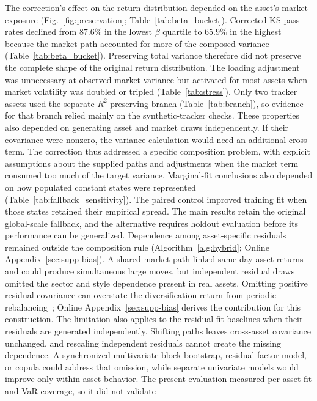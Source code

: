 The correction's effect on the return distribution depended on the
asset's market exposure (Fig.~\ref{fig:preservation};
Table~\ref{tab:beta_bucket}). Corrected KS pass rates declined from
$87.6\%$ in the lowest $\beta$ quartile to $65.9\%$ in the highest
because the market path accounted for more of the composed variance
(Table~\ref{tab:beta_bucket}). Preserving total variance therefore
did not preserve the complete shape of the original return
distribution. The loading adjustment was unnecessary at observed
market variance but activated for most assets when market volatility
was doubled or tripled (Table~\ref{tab:stress}). Only two tracker
assets used the separate $R^2$-preserving branch
(Table~\ref{tab:branch}), so evidence for that branch relied mainly
on the synthetic-tracker checks. These properties also depended on
generating asset and market draws independently. If their covariance
were nonzero, the variance calculation would need an additional
cross-term. The correction thus addressed a specific composition
problem, with explicit assumptions about the supplied paths and
adjustments when the market term consumed too much of the target
variance.
Marginal-fit conclusions also depended on how populated constant
states were represented (Table~\ref{tab:fallback_sensitivity}). The paired control improved training fit
when those states retained their empirical spread. The main results
retain the original global-scale fallback, and the alternative
requires holdout evaluation before its performance can be generalized.
Dependence among asset-specific residuals remained outside the
composition rule (Algorithm~\ref{alg:hybrid}; Online
Appendix~\ref{sec:supp-bias}). A shared market path linked same-day asset returns and
could produce simultaneous large moves, but independent residual
draws omitted the sector and style dependence present in real assets.
Omitting positive residual covariance can overstate the diversification
return from periodic rebalancing~\cite{boothFama1992,
boucheyNemtchinovWong2015, markowitz1976longRun}; Online
Appendix~\ref{sec:supp-bias} derives the contribution for this
construction. The limitation also applies to the residual-fit
baselines when their residuals are generated independently. Shifting
paths leaves cross-asset covariance unchanged, and rescaling
independent residuals cannot create the missing dependence. A
synchronized multivariate block bootstrap, residual factor model, or
copula could address that omission, while separate univariate models
would improve only within-asset behavior. The present evaluation
measured per-asset fit and VaR coverage, so it did not validate

